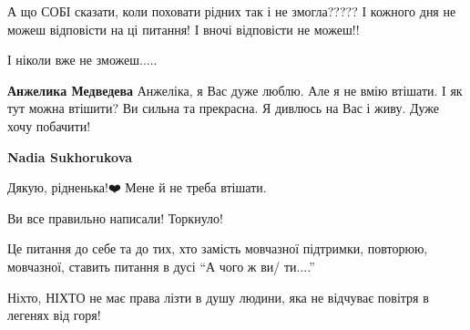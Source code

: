 
А що СОБІ сказати, коли поховати рідних так і не змогла????? І кожного дня не
можеш відповісти на ці питання! І вночі відповісти не можеш!!

І ніколи вже не зможеш.....

\begin{itemize} %
\textbf{Анжелика Медведева} Анжеліка, я Вас дуже люблю. Але я не вмію втішати. І як тут можна втішити? Ви сильна та прекрасна. Я дивлюсь на Вас і живу. Дуже хочу побачити!

\textbf{Nadia Sukhorukova} 

Дякую, рідненька!❤️ Мене й не треба втішати.

Ви все правильно написали! Торкнуло!

Це питання до себе та до тих, хто замість мовчазної підтримки, повторюю,
мовчазної, ставить питання в дусі \enquote{А чого ж ви/ ти....}

Ніхто, НІХТО не має права лізти в душу людини, яка не відчуває повітря в
легенях від горя!
\end{itemize} %
